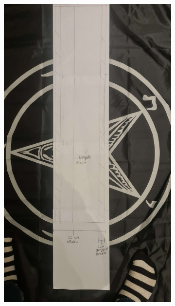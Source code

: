 \documentclass{report}
\newcommand{\subimgw}{.7\linewidth}
\begin{document}
\begin{figure}[H]
	\centering
	\begin{subfigure}{.5\textwidth}
		\centering
		\includegraphics [width=\subimgw]{task-3-far}


\end{subfigure}
\end{figure}
\end{document}
